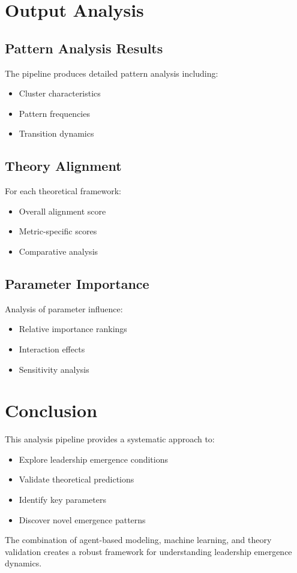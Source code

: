 \documentclass[11pt]{article}
\begin{document}
\section{Output Analysis}
\subsection{Pattern Analysis Results}
The pipeline produces detailed pattern analysis including:
\begin{itemize}
    \item Cluster characteristics
    \item Pattern frequencies
    \item Transition dynamics
\end{itemize}

\subsection{Theory Alignment}
For each theoretical framework:
\begin{itemize}
    \item Overall alignment score
    \item Metric-specific scores
    \item Comparative analysis
\end{itemize}

\subsection{Parameter Importance}
Analysis of parameter influence:
\begin{itemize}
    \item Relative importance rankings
    \item Interaction effects
    \item Sensitivity analysis
\end{itemize}

\section{Conclusion}
This analysis pipeline provides a systematic approach to:
\begin{itemize}
    \item Explore leadership emergence conditions
    \item Validate theoretical predictions
    \item Identify key parameters
    \item Discover novel emergence patterns
\end{itemize}

The combination of agent-based modeling, machine learning, and theory validation creates a robust framework for understanding leadership emergence dynamics.
\end{document}
